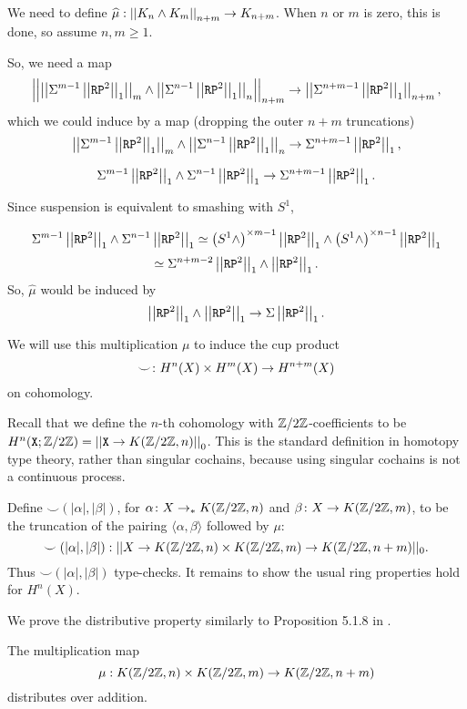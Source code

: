 \documentclass{amsart}
\begin{document}
We need to define $\widehat{\mu}:\left| \left| K_n\wedge K_m\right| \right|_{n+m}\to K_{n+m}$. When $n$ or $m$ is zero, this is done, so assume $n,m\geq 1$. 

So, we need a map
\[\left| \left| \left| \left| \Sigma^{m-1}\left| \left| \mathtt{RP}^2\right| \right|_1\right| \right|_m\wedge\left| \left| \Sigma^{n-1}\left| \left| \mathtt{RP}^2\right| \right|_1\right| \right|_n\right| \right|_{n+m}\to\left| \left| \Sigma^{n+m-1}\left| \left| \mathtt{RP}^2\right| \right|_1\right| \right|_{n+m},\]
which we could induce by a map (dropping the outer $n+m$ truncations)
\[\left| \left| \Sigma^{m-1}\left| \left| \mathtt{RP}^2\right| \right|_1\right| \right|_m\wedge\left| \left| \Sigma^{n-1}\left| \left| \mathtt{RP}^2\right| \right|_1\right| \right|_n\to\Sigma^{n+m-1}\left| \left| \mathtt{RP}^2\right| \right|_1,\]

\[\Sigma^{m-1}\left| \left| \mathtt{RP}^2\right| \right|_1\wedge\Sigma^{n-1}\left| \left| \mathtt{RP}^2\right| \right|_1\to\Sigma^{n+m-1}\left| \left| \mathtt{RP}^2\right| \right|_1.\]

Since suspension is equivalent to smashing with $S^1$,

\[\Sigma^{m-1}\left| \left| \mathtt{RP}^2\right| \right|_1\wedge\Sigma^{n-1}\left| \left| \mathtt{RP}^2\right| \right|_1\simeq \left(S^1\wedge\right)^{\times m-1}\left| \left| \mathtt{RP}^2\right| \right|_1\wedge\left(S^1\wedge\right)^{\times n-1}\left| \left| \mathtt{RP}^2\right| \right|_1\]
\[\simeq\Sigma^{n+m-2}\left| \left| \mathtt{RP}^2\right| \right|_1\wedge\left| \left| \mathtt{RP}^2\right| \right|_1.\]
So, $\widehat{\mu}$ would be induced by
\[\left| \left| \mathtt{RP}^2\right| \right|_1\wedge \left| \left| \mathtt{RP}^2\right| \right|_1\to \Sigma\left| \left| \mathtt{RP}^2\right| \right|_1.\]





\Amelia{**********}

We will use this multiplication $\mu$ to induce
the cup product
\[
\smile \colon H^n(X) \times H^m(X) \to H^{n+m}(X)
\]
on cohomology. 



Recall that we define the $ n $-th cohomology
with $ \mathbb{Z}/2\mathbb{Z} $-coefficients to be
$H^n(\mathtt{X};\mathbb{Z}/2\mathbb{Z})= \left| \left| \mathtt{X}\rightarrow K(\mathbb{Z}/2\mathbb{Z},n)\right| \right|_0$. This is the
standard definition in homotopy type theory, rather than
singular cochains, because using singular cochains is not
a continuous process. 

Define
$ \smile ( |\alpha|, |\beta|)  $, for
$ \alpha \colon X \to_\ast K(\mathbb{Z}/2\mathbb{Z},n) $ and
$ \beta \colon X \to K(\mathbb{Z}/2\mathbb{Z},m) $, to be the truncation of the
pairing $ \langle \alpha, \beta \rangle $ followed by $ \mu $:
\[
\smile ( |\alpha|, |\beta|)  :
|| X \to K(\mathbb{Z}/2\mathbb{Z},n) \times K(\mathbb{Z}/2\mathbb{Z},m) \to K(\mathbb{Z}/2\mathbb{Z},n+m) ||_0.
\]
Thus $ \smile ( |\alpha|, |\beta| ) $ type-checks. It
remains to show the usual ring properties hold for $ H^n(X)
$.  

We prove the distributive property similarly to Proposition 5.1.8 in \cite{brunerie:thesis}.
\begin{proposition}
	The multiplication map \[{\mu}:K(\mathbb{Z}/2\mathbb{Z},n)\times K(\mathbb{Z}/2\mathbb{Z},m)\to K(\mathbb{Z}/2\mathbb{Z},n+m)\] distributes over addition.
	\end{proposition}
\end{document}
